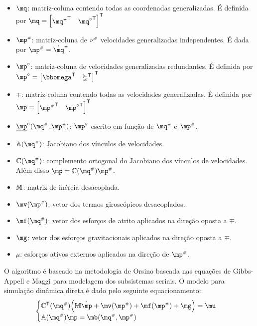 \documentclass[a4paper,11pt,brazil,fleqn]{article}
\begin{document}
\begin{itemize}
\item $\mq$: matriz-coluna contendo todas as coordenadas generalizadas. \'E definida por $\mq = \begin{bmatrix} {\mq\ssh}^\msT & {\mq\cir}^\msT \end{bmatrix}^\msT $
\item $\mp\ssh$: matriz-coluna de $\nu^{\scriptscriptstyle \#}$ velocidades generalizadas independentes. \'E dada por $\mp\ssh = \dot{\mq}\ssh$.
\item $\mp\cir$: matriz-coluna de velocidades generalizadas redundantes. \'E definida por $\mp\cir = \begin{bmatrix} \momega^\msT & \mathbb{\nu}^\msT \end{bmatrix}^\msT $
\item $\mp$: matriz-coluna contendo todas as velocidades generalizadas. \'E definida por $\mp = \begin{bmatrix} {\mp\ssh}^\msT & {\mp\cir}^\msT \end{bmatrix}^\msT $
\item $\underline{\mp}\cir(\mq\ssh,\mp\ssh)$: $\mp\cir$ escrito em fun\c{c}\~ao de $\mq\ssh$ e $\mp\ssh$.
\item $\mA(\mq\ssh)$: Jacobiano dos v\'inculos de velocidades.
\item $\mC(\mq\ssh)$: complemento ortogonal do Jacobiano dos v\'inculos de velocidades. Al\'em disso $\mp = \mC(\mq\ssh) \mp\ssh$.
\item $\mathbb{M}$: matriz de in\'ercia desacoplada.
\item $\mv(\mp\ssh)$: vetor dos termos girosc\'opicos desacoplados.
\item $\mf(\mq\ssh)$: vetor dos esfor\c{c}os de atrito aplicados na dire\c{c}\~ao oposta a $\mp$.
\item $\mg$: vetor dos esfor\c{c}os gravitacionais aplicados na dire\c{c}\~ao oposta a $\mp$.
\item $\mu $: esfor\c{c}os ativos externos aplicados na dire\c{c}\~ao de $\mp\ssh$.

\end{itemize}

O algoritmo \'e baseado na metodologia de Orsino baseada nas equa\c{c}\~oes de Gibbs-Appell e Maggi para modelagem dos subsistemas seriais. O modelo para simula\c{c}\~ao din\^amica direta \'e dado pelo seguinte equacionamento:
\begin{equation} \label{eq:DinamicaDireta}
\begin{cases}
\mC^\mathsf{T}(\mq\ssh) \Big( \mM \dot{\mp} + \mv(\mp\ssh) + \mf(\mp\ssh) + \mg \Big) = \mu \\
\mA(\mq\ssh) \dot{\mp} = \mb(\mq\ssh,\mp\ssh)
\end{cases}
\end{equation}
\end{document}
